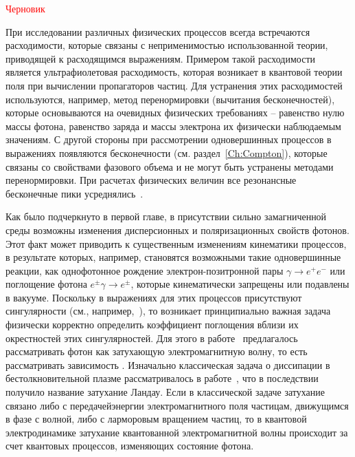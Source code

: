 \textcolor{red}{Черновик}

При исследовании различных физических процессов всегда встречаются расходимости, которые связаны с неприменимостью использованной теории, приводящей к расходящимся выражениям. Примером такой расходимости является ультрафиолетовая расходимость, которая возникает в квантовой теории поля при вычислении пропагаторов частиц. Для устранения этих расходимостей используются, например, метод перенормировки (вычитания бесконечностей), которые основываются на очевидных физических требованиях -- равенство нулю массы фотона, равенство заряда и массы электрона их физически наблюдаемым значениям. С другой стороны при рассмотрении одновершинных процессов в выражениях появляются  бесконечности (см. раздел~\ref{Ch:Compton}), которые связаны со свойствами фазового объема и не могут быть устранены методами перенормировки.
При расчетах физических величин все резонансные бесконечные пики усреднялись~\cite{Baier:2007}.

Как было подчеркнуто в первой главе, в присутствии сильно замагниченной среды 
возможны изменения дисперсионных и поляризационных свойств фотонов. Этот факт 
может приводить к существенным изменениям кинематики процессов, в результате 
которых, например, становятся возможными такие одновершинные реакции, как однофотонное 
рождение электрон-позитронной пары $\gamma\to e^+e^-$ или поглощение фотона 
$e^{\pm}\gamma\to e^{\pm}$, которые кинематически запрещены или подавлены в 
вакууме. Поскольку в выражениях для этих процессов присутствуют сингулярности (см., например,~\cite{Klepikov:1954,Sturrock:1971,Tademaru:1973,Daugherty:1983,Shabad:1988}), то возникает принципиально важная задача физически корректно определить коэффициент поглощения вблизи их окрестностей этих сингулярностей.
Для этого в работе~\cite{Shabad:1988} предлагалось рассматривать фотон как затухающую электромагнитную волну, то есть рассматривать зависимость . Изначально классическая задача о диссипации  в бестолкновительной плазме рассматривалось в работе~\cite{Landau:1946}, что в последствии получило название затухание Ландау. Если в классической задаче затухание связано либо с передачейэнергии электромагнитного поля частицам, движущимся в фазе с волной, либо с ларморовым вращением частиц, то в квантовой электродинамике затухание квантованной электромагнитной волны происходит за счет квантовых процессов, изменяющих состояние фотона.

